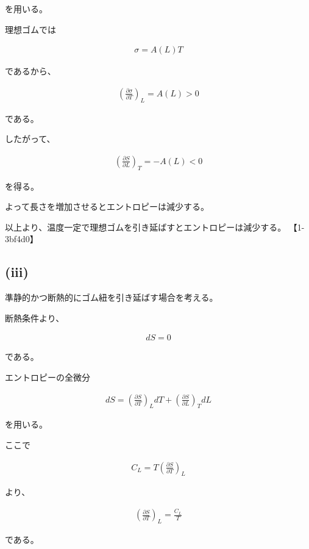 \documentclass[platex,dvipdfmx,a4paper]{jsarticle}
\begin{document}
を用いる。

理想ゴムでは

\begin{align*}
\sigma=A(L)T
\end{align*}

であるから、

\begin{align*}
\left(
\frac{\partial \sigma}{\partial T}
\right)_L
=
A(L)
>
0
\end{align*}

である。

したがって、

\begin{align*}
\left(
\frac{\partial S}{\partial L}
\right)_T
=
-A(L)
<
0
\end{align*}

を得る。

よって長さを増加させるとエントロピーは減少する。

以上より、温度一定で理想ゴムを引き延ばすとエントロピーは減少する。 【1-3bf4d0】

\subsection{(iii)}

準静的かつ断熱的にゴム紐を引き延ばす場合を考える。

断熱条件より、

\begin{align*}
dS=0
\end{align*}

である。

エントロピーの全微分

\begin{align*}
dS
=
\left(
\frac{\partial S}{\partial T}
\right)_L dT
+
\left(
\frac{\partial S}{\partial L}
\right)_T dL
\end{align*}

を用いる。

ここで

\begin{align*}
C_L
=
T
\left(
\frac{\partial S}{\partial T}
\right)_L
\end{align*}

より、

\begin{align*}
\left(
\frac{\partial S}{\partial T}
\right)_L
=
\frac{C_L}{T}
\end{align*}

である。
\end{document}
